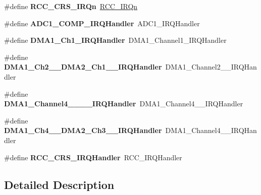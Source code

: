 \begin{DoxyCompactItemize}
\#define {\bfseries R\+C\+C\+\_\+\+C\+R\+S\+\_\+\+I\+R\+Qn}~\hyperlink{group___peripheral__interrupt__number__definition_gga7e1129cd8a196f4284d41db3e82ad5c8a5710b22392997bac63daa5c999730f77}{R\+C\+C\+\_\+\+I\+R\+Qn}
\item 
\mbox{\label{group__stm32f070x6_gaeb3545df015f964b68346cda78f7cea5}} 
\#define {\bfseries A\+D\+C1\+\_\+\+C\+O\+M\+P\+\_\+\+I\+R\+Q\+Handler}~A\+D\+C1\+\_\+\+I\+R\+Q\+Handler
\item 
\mbox{\label{group__stm32f070x6_ga3f7debe9fc2548ab6640825967110101}} 
\#define {\bfseries D\+M\+A1\+\_\+\+Ch1\+\_\+\+I\+R\+Q\+Handler}~D\+M\+A1\+\_\+\+Channel1\+\_\+\+I\+R\+Q\+Handler
\item 
\mbox{\label{group__stm32f070x6_ga3752ab0b9a6635ccd7bc87b99ee8fd9b}} 
\#define {\bfseries D\+M\+A1\+\_\+\+Ch2\+\_\+\_\+\+D\+M\+A2\+\_\+\+Ch1\+\_\+\_\+\+I\+R\+Q\+Handler}~D\+M\+A1\+\_\+\+Channel2\+\_\+\_\+\+I\+R\+Q\+Handler
\item 
\mbox{\label{group__stm32f070x6_gae3db46ad17e9f800e0f88b489eed522d}} 
\#define {\bfseries D\+M\+A1\+\_\+\+Channel4\+\_\+\_\+\_\+\_\+\+I\+R\+Q\+Handler}~D\+M\+A1\+\_\+\+Channel4\+\_\+\_\+\+I\+R\+Q\+Handler
\item 
\mbox{\label{group__stm32f070x6_ga035f9aa47c046222541cca70e281b415}} 
\#define {\bfseries D\+M\+A1\+\_\+\+Ch4\+\_\+\_\+\+D\+M\+A2\+\_\+\+Ch3\+\_\+\_\+\+I\+R\+Q\+Handler}~D\+M\+A1\+\_\+\+Channel4\+\_\+\_\+\+I\+R\+Q\+Handler
\item 
\mbox{\label{group__stm32f070x6_ga82a9eac30db2cc914975bc71ce5fcb92}} 
\#define {\bfseries R\+C\+C\+\_\+\+C\+R\+S\+\_\+\+I\+R\+Q\+Handler}~R\+C\+C\+\_\+\+I\+R\+Q\+Handler
\end{DoxyCompactItemize}


\subsection{Detailed Description}
